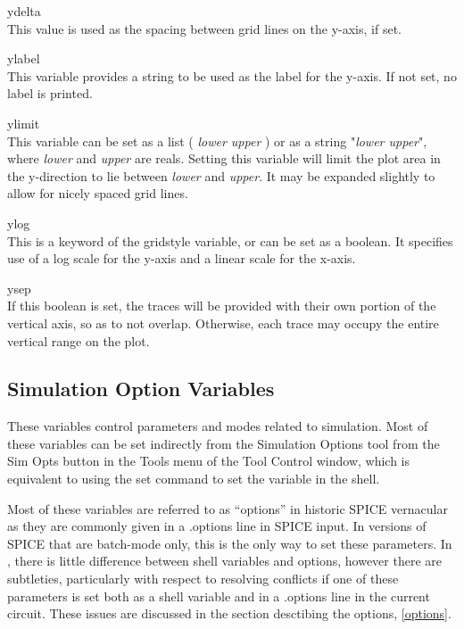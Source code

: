 \begin{description}
\item{\et ydelta}\\
This value is used as the spacing between grid lines on the y-axis, if
set.

\item{\et ylabel}\\
This variable provides a string to be used as the label for the
y-axis.  If not set, no label is printed.

\item{\et ylimit}\\
This variable can be set as a list {\vt (} {\it lower upper} {\vt )}
or as a string {\vt "}{\it lower upper}{\vt "}, where {\it lower} and
{\it upper} are reals.  Setting this variable will limit the plot area
in the y-direction to lie between {\it lower} and {\it upper}.  It may
be expanded slightly to allow for nicely spaced grid lines.

\item{\et ylog}\\
This is a keyword of the {\et gridstyle} variable, or can be set as a
boolean.  It specifies use of a log scale for the y-axis and a linear
scale for the x-axis.

\item{\et ysep}\\
If this boolean is set, the traces will be provided with their own
portion of the vertical axis, so as to not overlap.  Otherwise, each
trace may occupy the entire vertical range on the plot.
\end{description}

\subsection{Simulation Option Variables}
\label{simvars}


These variables control parameters and modes related to simulation. 
Most of these variables can be set indirectly from the {\cb Simulation
Options} tool from the {\cb Sim Opts} button in the {\cb Tools} menu
of the {\cb Tool Control} window, which is equivalent to using the
{\cb set} command to set the variable in the {\WRspice} shell.

Most of these variables are referred to as ``options'' in historic
SPICE vernacular as they are commonly given in a {\vt .options} line
in SPICE input.  In versions of SPICE that are batch-mode only, this
is the only way to set these parameters.  In {\WRspice}, there is
little difference between shell variables and options, however there
are subtleties, particularly with respect to resolving conflicts if
one of these parameters is set both as a shell variable and in a {\vt
.options} line in the current circuit.  These issues are discussed in
the section desctibing the options, \ref{options}. 
 
